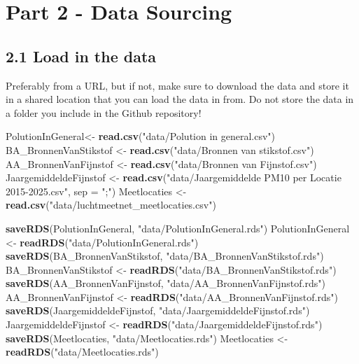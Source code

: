 \documentclass[
]{article}
\newenvironment{Shaded}{\begin{snugshade}}{\end{snugshade}}
\newcommand{\AttributeTok}[1]{\textcolor[rgb]{0.13,0.29,0.53}{#1}}
\newcommand{\FunctionTok}[1]{\textcolor[rgb]{0.13,0.29,0.53}{\textbf{#1}}}
\newcommand{\NormalTok}[1]{#1}
\newcommand{\OtherTok}[1]{\textcolor[rgb]{0.56,0.35,0.01}{#1}}
\newcommand{\StringTok}[1]{\textcolor[rgb]{0.31,0.60,0.02}{#1}}
\begin{document}
\section{Part 2 - Data Sourcing}\label{part-2---data-sourcing}

\subsection{2.1 Load in the data}\label{load-in-the-data}

Preferably from a URL, but if not, make sure to download the data and
store it in a shared location that you can load the data in from. Do not
store the data in a folder you include in the Github repository!

\begin{Shaded}
\begin{Highlighting}[]
\NormalTok{PolutionInGeneral}\OtherTok{\textless{}{-}} \FunctionTok{read.csv}\NormalTok{(}\StringTok{"data/Polution in general.csv"}\NormalTok{)}
\NormalTok{BA\_BronnenVanStikstof }\OtherTok{\textless{}{-}} \FunctionTok{read.csv}\NormalTok{(}\StringTok{"data/Bronnen van stikstof.csv"}\NormalTok{)}
\NormalTok{AA\_BronnenVanFijnstof }\OtherTok{\textless{}{-}} \FunctionTok{read.csv}\NormalTok{(}\StringTok{"data/Bronnen van Fijnstof.csv"}\NormalTok{)}
\NormalTok{JaargemiddeldeFijnstof }\OtherTok{\textless{}{-}} \FunctionTok{read.csv}\NormalTok{(}\StringTok{"data/Jaargemiddelde PM10 per Locatie 2015{-}2025.csv"}\NormalTok{, }\AttributeTok{sep =} \StringTok{";"}\NormalTok{)}
\NormalTok{Meetlocaties }\OtherTok{\textless{}{-}} \FunctionTok{read.csv}\NormalTok{(}\StringTok{"data/luchtmeetnet\_meetlocaties.csv"}\NormalTok{)}


\FunctionTok{saveRDS}\NormalTok{(PolutionInGeneral, }\StringTok{"data/PolutionInGeneral.rds"}\NormalTok{)}
\NormalTok{PolutionInGeneral }\OtherTok{\textless{}{-}} \FunctionTok{readRDS}\NormalTok{(}\StringTok{"data/PolutionInGeneral.rds"}\NormalTok{)}
\FunctionTok{saveRDS}\NormalTok{(BA\_BronnenVanStikstof, }\StringTok{"data/BA\_BronnenVanStikstof.rds"}\NormalTok{)}
\NormalTok{BA\_BronnenVanStikstof }\OtherTok{\textless{}{-}} \FunctionTok{readRDS}\NormalTok{(}\StringTok{"data/BA\_BronnenVanStikstof.rds"}\NormalTok{)}
\FunctionTok{saveRDS}\NormalTok{(AA\_BronnenVanFijnstof, }\StringTok{"data/AA\_BronnenVanFijnstof.rds"}\NormalTok{)}
\NormalTok{AA\_BronnenVanFijnstof }\OtherTok{\textless{}{-}} \FunctionTok{readRDS}\NormalTok{(}\StringTok{"data/AA\_BronnenVanFijnstof.rds"}\NormalTok{)}
\FunctionTok{saveRDS}\NormalTok{(JaargemiddeldeFijnstof, }\StringTok{"data/JaargemiddeldeFijnstof.rds"}\NormalTok{)}
\NormalTok{JaargemiddeldeFijnstof }\OtherTok{\textless{}{-}} \FunctionTok{readRDS}\NormalTok{(}\StringTok{"data/JaargemiddeldeFijnstof.rds"}\NormalTok{)}
\FunctionTok{saveRDS}\NormalTok{(Meetlocaties, }\StringTok{"data/Meetlocaties.rds"}\NormalTok{)}
\NormalTok{Meetlocaties }\OtherTok{\textless{}{-}} \FunctionTok{readRDS}\NormalTok{(}\StringTok{"data/Meetlocaties.rds"}\NormalTok{)}
\end{Highlighting}
\end{Shaded}
\end{document}
